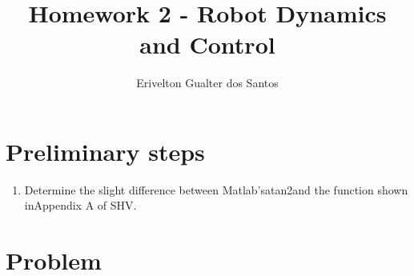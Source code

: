 \documentclass[a4paper,10pt]{article}
\title{Homework 2 - Robot Dynamics and Control}
\author{Erivelton Gualter dos Santos}
\begin{document}
\date{}
\maketitle

\section*{Preliminary steps}

\begin{enumerate}
 \item Determine the slight difference between Matlab’satan2and the function shown inAppendix A of SHV.
\end{enumerate}

\section{Problem}
\end{document}
